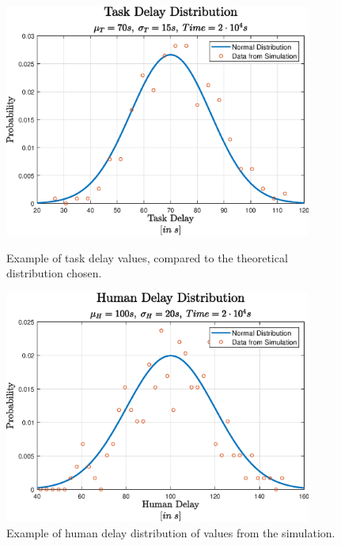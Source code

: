 \documentclass{article}
\begin{document}
			\begin{figure}[H]
				\centering
				\begin{minipage}{0.45\textwidth}
					\centering
					\includegraphics[width=0.9\textwidth]{./Images/taskDelay}
					\caption{Example of task delay values, compared to the theoretical distribution chosen.}
				\end{minipage}\hfill
				\begin{minipage}{0.45\textwidth}
					\centering
					\includegraphics[width=0.9\textwidth]{./Images/humanDelay}
					\caption{Example of human delay distribution of values from the simulation.}
				\end{minipage}
			\end{figure}
			
\end{document}
